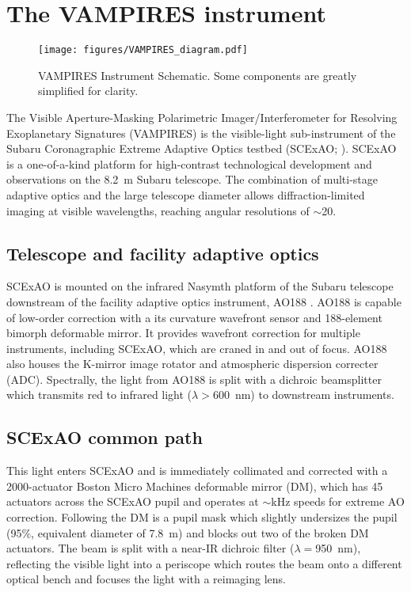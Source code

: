 \section{The VAMPIRES instrument}\label{sec:design}

\begin{figure*}[t]
    \centering
    \texttt{[image: figures/VAMPIRES\_diagram.pdf]}
    \caption{VAMPIRES Instrument Schematic. Some components are greatly simplified for clarity.}
    \label{fig:schematic}
\end{figure*}

The Visible Aperture-Masking Polarimetric Imager/Interferometer for Resolving Exoplanetary Signatures (VAMPIRES) is the visible-light sub-instrument of the Subaru Coronagraphic Extreme Adaptive Optics testbed (SCExAO; \citet{jovanovic_subaru_2015}). SCExAO is a one-of-a-kind platform for high-contrast technological development and observations on the \SI{8.2}{\meter} Subaru telescope. The combination of multi-stage adaptive optics and the large telescope diameter allows diffraction-limited imaging at visible wavelengths, reaching angular resolutions of $\sim$\SI{20}{\mas}. 


\subsection{Telescope and facility adaptive optics}
SCExAO is mounted on the infrared Nasymth platform of the Subaru telescope downstream of the facility adaptive optics instrument, AO188 \citep{minowa_performance_2010}. AO188 is capable of low-order correction with a its curvature wavefront sensor and 188-element bimorph deformable mirror. It provides wavefront correction for multiple instruments, including SCExAO, which are craned in and out of focus. AO188 also houses the K-mirror image rotator and atmospheric dispersion correcter (ADC). Spectrally, the light from AO188 is split with a dichroic beamsplitter which transmits red to infrared light ($\lambda >$\SI{600}{\nano\meter}) to downstream instruments.

\subsection{SCExAO common path}
This light enters SCExAO and is immediately collimated and corrected with a 2000-actuator Boston Micro Machines deformable mirror (DM), which has 45 actuators across the SCExAO pupil and operates at $\sim$\si{\kilo\hertz} speeds for extreme AO correction. Following the DM is a pupil mask which slightly undersizes the pupil (95\%, equivalent diameter of \SI{7.8}{\meter}) and blocks out two of the broken DM actuators. The beam is split with a near-IR dichroic filter ($\lambda=$\SI{950}{\nano\meter}), reflecting the visible light into a periscope which routes the beam onto a different optical bench and focuses the light with a reimaging lens.


